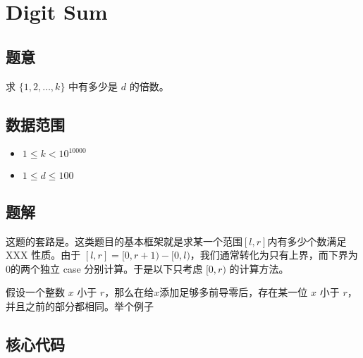 \section{Digit Sum}
\subsection*{题意}
求 $\{1,2,\ldots,k\}$ 中有多少是 $d$ 的倍数。
\subsection*{数据范围}
\begin{itemize}
\item $1 \leq k < 10^{10000}$
\item $1 \leq d \leq 100$
\end{itemize}

\subsection*{题解}

这题的套路是\textbf{}。这类题目的基本框架就是求某一个范围$[l,r]$内有多少个数满足 XXX 性质。由于 $[l,r] = [0,r+1) - [0,l)$，我们通常转化为只有上界，而下界为$0$的两个独立 case 分别计算。于是以下只考虑 $[0,r)$ 的计算方法。

假设一个整数 $x$ 小于 $r$，那么在给$x$添加足够多前导零后，存在某一位 $x$ 小于 $r$，并且之前的部分都相同。举个例子









\subsection*{核心代码}
\inputminted[linenos,autogobble]{cpp}{../Code/S.cpp}
\newpage